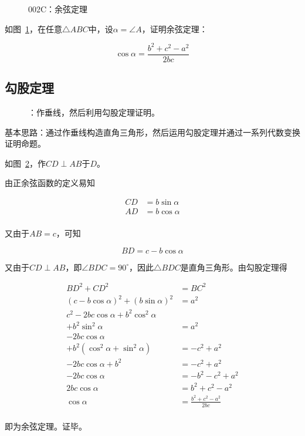 

\begin{figure}[htbp]
  \centering
  \caption{002C：余弦定理} \label{fig:002C}
\end{figure}

如图~\ref{fig:002C}，在任意$\triangle ABC$中，设$\alpha = \angle A$，证明余弦定理：

\[ \cos\alpha = \frac{b^2 + c^2 - a^2}{2bc} \]

\subsection{勾股定理} \label{subsec:002C-pyth}

\begin{figure}[htbp]
  \centering
  \caption{：作垂线，然后利用勾股定理证明。} \label{fig:002C-pyth}
\end{figure}

基本思路：通过作垂线构造直角三角形，然后运用勾股定理并通过一系列代数变换证明命题。

如图~\ref{fig:002C-pyth}，作$CD \perp AB$于$D$。

由正余弦函数的定义易知

\begin{align*}
  CD &= b\sin\alpha \\
  AD &= b\cos\alpha \\
\end{align*}

又由于$AB = c$，可知

\[ BD = c - b\cos\alpha \]

又由于$CD \perp AB$，即$\angle BDC = 90^\circ$，因此$\triangle BDC$是直角三角形。由勾股定理得

\begin{align*}
  BD^2 + CD^2 &= BC^2 \\
  (c - b\cos\alpha)^2 + (b\sin\alpha)^2 &= a^2 \\
  c^2 - 2bc\cos\alpha + b^2\cos^2\alpha & \\
  + b^2\sin^2\alpha &= a^2 \\
  -2bc\cos\alpha & \\
  + b^2(\cos^2\alpha + \sin^2\alpha) &= -c^2 + a^2 \\
  -2bc\cos\alpha + b^2 &= -c^2 + a^2 \\
  -2bc\cos\alpha &= -b^2 - c^2 + a^2 \\
  2bc\cos\alpha &= b^2 + c^2 - a^2 \\
  \cos\alpha &= \frac{b^2 + c^2 - a^2}{2bc} \\
\end{align*}

即为余弦定理。证毕。
